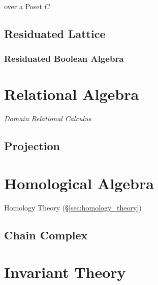 over a Poset $C$



\subsection{Residuated Lattice}\label{sec:residuated_lattice}

\subsubsection{Residuated Boolean Algebra}
\label{sec:residuated_boolean_algebra}



\section{Relational Algebra}\label{sec:relational_algebra}

\emph{Domain Relational Calculus}

\subsection{Projection}\label{sec:relational_projection}



\section{Homological Algebra}\label{sec:homological_algebra}

Homology Theory (\S\ref{sec:homology_theory})



\subsection{Chain Complex}\label{sec:chain_complex}



\section{Invariant Theory}\label{sec:invariant_theory}
